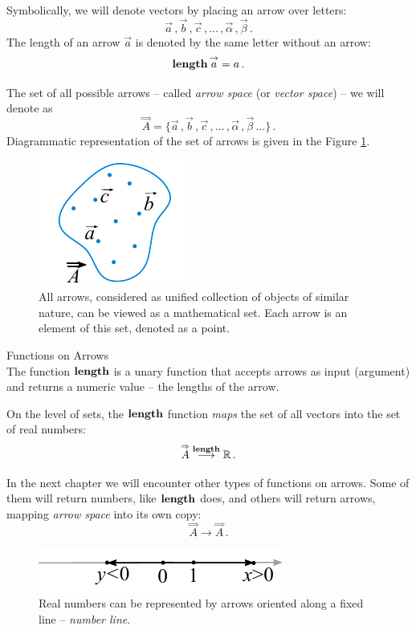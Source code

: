 Symbolically, we will denote vectors by placing an arrow over letters:
\[
\vec{a}\,,\vec{b}\,,\vec{c}\,,\ldots\,,\vec{\alpha}\,,\vec{\beta}\,.
\]
The length of an arrow $\vec{a}$ is denoted by the same letter
without an arrow:
\[
\textrm{\bf {length}}\,\overset{\rightarrow}{a} = a\,.
\]

The set of all possible arrows -- called \emph{arrow space} (or
\emph{vector space}) -- we will denote as
\[
	\overset{\Rightarrow}{A} = \lbrace \vec{a}\,,\vec{b}\,,\vec{c}\,,\ldots\,,\vec{\alpha}\,,\vec{\beta}\,\ldots \rbrace\,.
\]
Diagrammatic representation of the set of arrows is given in the
Figure \ref{fig:arrowsSpaceDiagram}.
\begin{figure}%
  \includegraphics[scale=1.0]{arrowsSpaceDiagram}
  \caption{All arrows, considered as unified collection of objects of
    similar nature, can be viewed as a mathematical set. Each arrow is
    an element of this set, denoted as a point.}
  \label{fig:arrowsSpaceDiagram}
\end{figure}

\begin{mybio}{Functions on Arrows}\\
The function $\textrm{\bf {length}}$ is a unary function that accepts arrows as input
(argument) and returns a numeric value -- the lengths of the arrow.

On the level of sets, the $\textrm{\bf {length}}$ function \emph{maps} the set
of all vectors into the set of real numbers:
\[
\overset{\Rightarrow}{A}\overset{\textrm{\bf {length}}}{\longrightarrow}\mathbb{R}\,.
\]

In the next chapter we will encounter other types of functions on arrows. Some of
them will return numbers, like $\textrm{\bf {length}}$ does, and others will return
arrows, mapping \emph{arrow space} into its own copy:
\[
\overset{\Rightarrow}{A} \longrightarrow \overset{\Rightarrow}{A}\,.
\]
\end{mybio}

\begin{figure}%
  \includegraphics[scale=1.0]{arrowsNumberLine}
  \caption{Real numbers can be represented by
    arrows oriented along a
    fixed line -- \emph{number line}.}
  \label{fig:arrowsNumberLine}
\end{figure}


